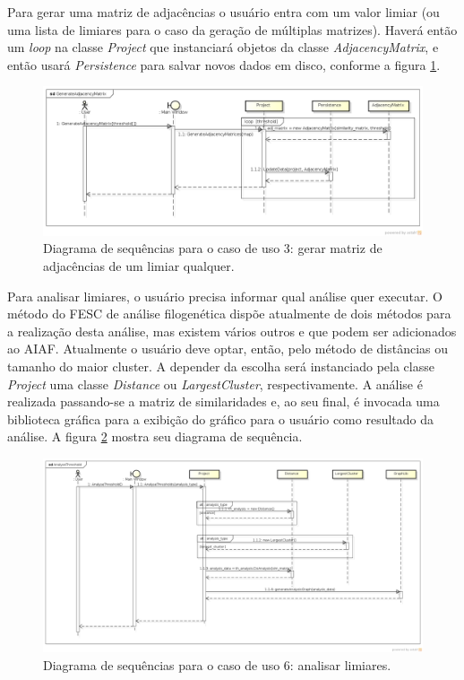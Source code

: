 Para gerar uma matriz de adjacências o usuário entra com um valor limiar (ou uma lista de limiares para o caso da geração de múltiplas matrizes). Haverá
então um \textit{loop} na classe \textit{Project} que instanciará objetos da classe \textit{AdjacencyMatrix}, e então usará \textit{Persistence} para salvar
novos dados em disco, conforme a figura \ref{fig:generate-adjacency-matrix}. \newline

\begin{figure}
\centering
\includegraphics[scale=0.42]{generate-adjacency-matrix}
\caption{Diagrama de sequências para o caso de uso 3: gerar matriz de adjacências de um limiar qualquer.}
\label{fig:generate-adjacency-matrix}
\end{figure}

Para analisar limiares, o usuário precisa informar qual análise quer executar. O método do FESC de análise filogenética dispõe atualmente de dois métodos
para a realização desta análise, mas existem vários outros e que podem ser adicionados ao AIAF. Atualmente o usuário deve optar, então, pelo método de
distâncias ou tamanho do maior cluster. A depender da escolha será instanciado pela classe \textit{Project} uma classe \textit{Distance} ou
\textit{LargestCluster}, respectivamente. A análise é realizada passando-se a matriz de similaridades e, ao seu final, é invocada uma biblioteca gráfica
para a exibição do gráfico para o usuário como resultado da análise. A figura \ref{fig:analyse-threshold} mostra seu diagrama de sequência. \newline

\begin{figure}
\centering
\includegraphics[scale=0.34]{analyse-threshold}
\caption{Diagrama de sequências para o caso de uso 6: analisar limiares.}
\label{fig:analyse-threshold}
\end{figure}

